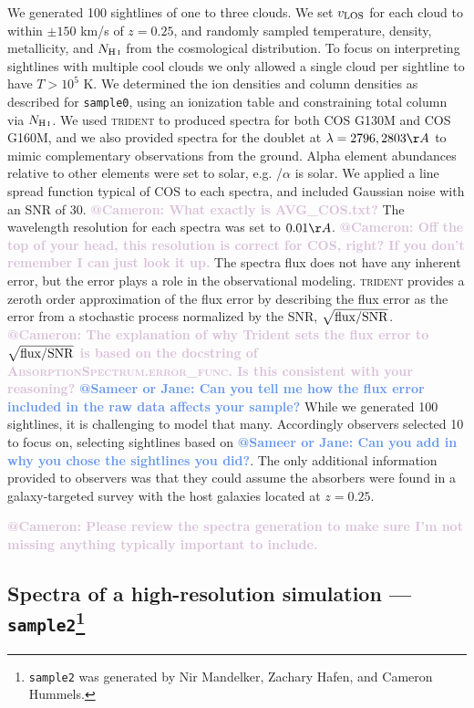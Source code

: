 \documentclass[fleqn,usenatbib]{mnras}
\makeatletter
\newcommand{\atsameer}[1]{\textcolor{CornflowerBlue}{\textbf{@Sameer or Jane: #1}}}
\newcommand{\atcameron}[1]{\textcolor{Thistle}{\textbf{@Cameron: #1}}}
\makeatother
\begin{document}
We generated 100 sightlines of one to three clouds.
We set $v_{\rm LOS}$ for each cloud to within $\pm150$ km/s of $z=0.25$, and randomly sampled temperature, density, metallicity, and $N_{\ion{H}{I}}$ from the cosmological distribution.
To focus on interpreting sightlines with multiple cool clouds we only allowed a single cloud per sightline to have $T>10^5$ K.
We determined the ion densities and column densities as described for \texttt{sample0}, using an ionization table and constraining total column via $N_{\ion{H}{I}}$.
We used \textsc{trident} to produced spectra for both COS G130M and COS G160M, and we also provided spectra for the  doublet at $\lambda = 2796, 2803 \AA$ to mimic complementary observations from the ground.
Alpha element abundances relative to other elements were set to solar, e.g. /$\alpha$ is solar.
We applied a line spread function typical of COS to each spectra, and included Gaussian noise with an SNR of 30.
\atcameron{What exactly is AVG\_COS.txt?}
The wavelength resolution for each spectra was set to $0.01 \AA$.
\atcameron{Off the top of your head, this resolution is correct for COS, right?
If you don't remember I can just look it up.}
The spectra flux does not have any inherent error, but the error plays a role in the observational modeling.
\textsc{trident} provides a zeroth order approximation of the flux error by describing the flux error as the error from a stochastic process normalized by the SNR, $\sqrt{{\rm flux}/{\rm SNR}}$.
\atcameron{The explanation of why Trident sets the flux error to $\sqrt{{\rm flux}/{\rm SNR}}$ is based on the docstring of \textsc{AbsorptionSpectrum.error\_func}.
Is this consistent with your reasoning?}
\atsameer{Can you tell me how the flux error included in the raw data affects your sample?}
While we generated 100 sightlines, it is challenging to model that many.
Accordingly observers selected 10 to focus on, selecting sightlines based on \atsameer{Can you add in why you chose the sightlines you did?}.
The only additional information provided to observers was that they could assume the absorbers were found in a galaxy-targeted survey with the host galaxies located at $z=0.25$.

\atcameron{Please review the spectra generation to make sure I'm not missing anything typically important to include.}

\subsection[Spectra of a high-resolution simulation --- \texttt{sample2}]{Spectra of a high-resolution simulation --- \texttt{sample2}\footnote{
\texttt{sample2} was generated by Nir Mandelker, Zachary Hafen, and Cameron Hummels.}}
\label{s: data generation -- sample2}
\end{document}
